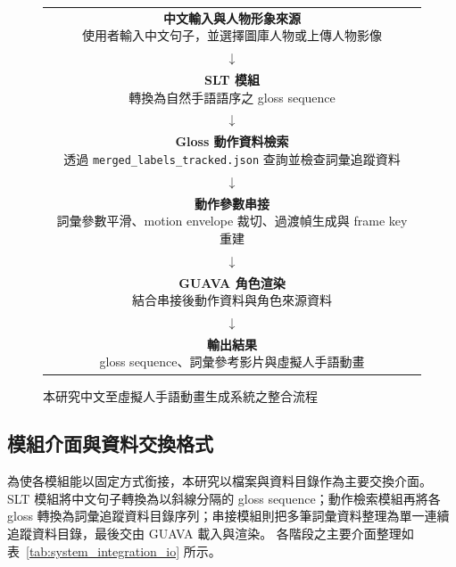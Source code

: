 \documentclass[class=NCU_thesis, crop=false]{standalone}
\begin{document}
\begin{figure}[H]
    \centering
    \renewcommand{\arraystretch}{1.2}
    \begin{tabular}{c}
        \fbox{\parbox{0.78\textwidth}{\centering
        \textbf{中文輸入與人物形象來源}\\
        使用者輸入中文句子，並選擇圖庫人物或上傳人物影像}} \\
        $\downarrow$ \\
        \fbox{\parbox{0.78\textwidth}{\centering
        \textbf{SLT 模組}\\
        轉換為自然手語語序之 gloss sequence}} \\
        $\downarrow$ \\
        \fbox{\parbox{0.78\textwidth}{\centering
        \textbf{Gloss 動作資料檢索}\\
        透過 \texttt{merged\_labels\_tracked.json} 查詢並檢查詞彙追蹤資料}} \\
        $\downarrow$ \\
        \fbox{\parbox{0.78\textwidth}{\centering
        \textbf{動作參數串接}\\
        詞彙參數平滑、motion envelope 裁切、過渡幀生成與 frame key 重建}} \\
        $\downarrow$ \\
        \fbox{\parbox{0.78\textwidth}{\centering
        \textbf{GUAVA 角色渲染}\\
        結合串接後動作資料與角色來源資料}} \\
        $\downarrow$ \\
        \fbox{\parbox{0.78\textwidth}{\centering
        \textbf{輸出結果}\\
        gloss sequence、詞彙參考影片與虛擬人手語動畫}} \\
    \end{tabular}
    \caption{本研究中文至虛擬人手語動畫生成系統之整合流程}
    \label{fig:system_integration_flow}
\end{figure}

\subsection{模組介面與資料交換格式}

為使各模組能以固定方式銜接，本研究以檔案與資料目錄作為主要交換介面。
SLT 模組將中文句子轉換為以斜線分隔的 gloss sequence；動作檢索模組再將各 gloss 轉換為詞彙追蹤資料目錄序列；串接模組則把多筆詞彙資料整理為單一連續追蹤資料目錄，最後交由 GUAVA 載入與渲染。
各階段之主要介面整理如表~\ref{tab:system_integration_io} 所示。
\end{document}
